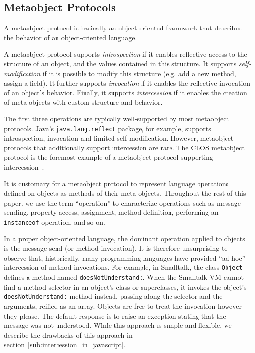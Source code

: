 \documentclass{acm_proc_article-sp}
\begin{document}
\subsection{Metaobject Protocols}

A metaobject protocol is basically an object-oriented framework that describes the behavior of an object-oriented language.

A metaobject protocol supports \emph{introspection} if it enables reflective access to the structure of an object, and the values contained in this structure. It supports \emph{self-modification} if it is possible to modify this structure (e.g. add a new method, assign a field). It further supports \emph{invocation} if it enables the reflective invocation of an object's behavior. Finally, it supports \emph{intercession} if it enables the creation of meta-objects with custom structure and behavior.

The first three operations are typically well-supported by most metaobject protocols. Java's \texttt{java.lang.reflect} package, for example, supports introspection, invocation and limited self-modification. However, metaobject protocols that additionally support intercession are rare. The CLOS metaobject protocol is the foremost example of a metaobject protocol supporting intercession~\cite{clos}.

It is customary for a metaobject protocol to represent language operations defined on objects as methods of their meta-objects. Throughout the rest of this paper, we use the term ``operation'' to characterize operations such as message sending, property access, assignment, method definition, performing an \texttt{instanceof} operation, and so on.

In a proper object-oriented language, the dominant operation applied to objects is the message send (or method invocation). It is therefore unsurprising to observe that, historically, many programming languages have provided ``ad hoc'' intercession of method invocations. For example, in Smalltalk, the class \texttt{Object} defines a method named \texttt{doesNotUnderstand:}. When the Smalltalk VM cannot find a method selector in an object's class or superclasses, it invokes the object's \texttt{doesNotUnderstand:} method instead, passing along the selector and the arguments, reified as an array. Objects are free to treat the invocation however they please. The default response is to raise an exception stating that the message was not understood. While this approach is simple and flexible, we describe the drawbacks of this approach in section~\ref{sub:intercession_in_javascript}.
\end{document}
